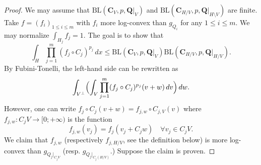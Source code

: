 \documentclass[10pt,a4paper]{amsart}
\begin{document}
\begin{proof}
    We may assume that $\mathrm{BL}(\textbf{C}_V,p,\textbf{Q}|_V)$ and $\mathrm{BL}(\textbf{C}_{H/V},p,\textbf{Q}|_{H \setminus V})$ are finite. Take $f=(f_i)_{1 \leq i \leq m}$ with $f_i$ more log-convex than $g_{Q_i}$ for any $1 \leq i \leq m.$ We may normalize $\int_{H_j}f_j=1.$ The goal is to show that $$\int_H \prod_{j=1}^m (f_j \circ C_j)^{p_j}\, dx \leq \mathrm{BL}(\textbf{C}_V,p,\textbf{Q}|_V)\mathrm{BL}(\textbf{C}_{H/V},p,\textbf{Q}|_{H/V}).$$ By Fubini-Tonelli, the left-hand side can be rewritten as $$\int_{V^\perp}\Bigl (\int_V \prod_{j=1}^m (f_j \circ C_j)^{p_j}(v+w)\, dv \Bigl)\, dw.$$ However, one can write $f_j \circ C_j(v+w)=f_{j,w}\circ C_{j,V}(v)$ where $f_{j,w}: C_jV \rightarrow [0;+\infty)$ is the function $$f_{j,w}(v_j)=f_j(v_j+C_jw) \quad \forall v_j \in C_jV.$$ We claim that $f_{j,w}$ (respectively $f_{j,H/V}$, see the definition below) is more log-convex than $g_{Q_j|_{C_jV}}$ (resp. $g_{Q_j|_{C_j(H/V)}}.$) Suppose the claim is proven.
    

\end{proof}
\end{document}

